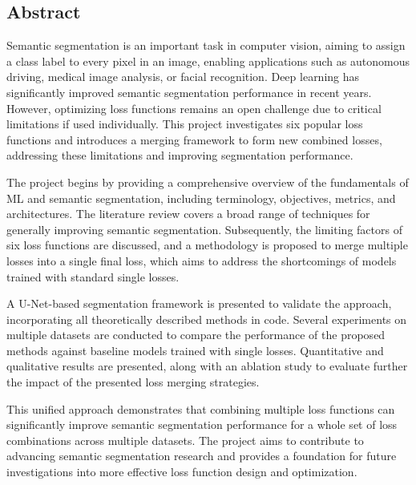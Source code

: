 \makeatother

\begin{newpage}
    \vspace*{\fill}
    \section*{Abstract}
    Semantic segmentation is an important task in computer vision, aiming to assign a class label to every pixel in an image, enabling applications such as autonomous driving, medical image analysis, or facial recognition. Deep learning has significantly improved semantic segmentation performance in recent years. However, optimizing loss functions remains an open challenge due to critical limitations if used individually. This project investigates six popular loss functions and introduces a merging framework to form new combined losses, addressing these limitations and improving segmentation performance.

    The project begins by providing a comprehensive overview of the fundamentals of \acf{ML} and semantic segmentation, including terminology, objectives, metrics, and architectures. The literature review covers a broad range of techniques for generally improving semantic segmentation. Subsequently, the limiting factors of six loss functions are discussed, and a methodology is proposed to merge multiple losses into a single final loss, which aims to address the shortcomings of models trained with standard single losses.

    A U-Net-based segmentation framework is presented to validate the approach, incorporating all theoretically described methods in code. Several experiments on multiple datasets are conducted to compare the performance of the proposed methods against baseline models trained with single losses. Quantitative and qualitative results are presented, along with an ablation study to evaluate further the impact of the presented loss merging strategies.

    This unified approach demonstrates that combining multiple loss functions can significantly improve semantic segmentation performance for a whole set of loss combinations across multiple datasets. The project aims to contribute to advancing semantic segmentation research and provides a foundation for future investigations into more effective loss function design and optimization.
\end{newpage}

